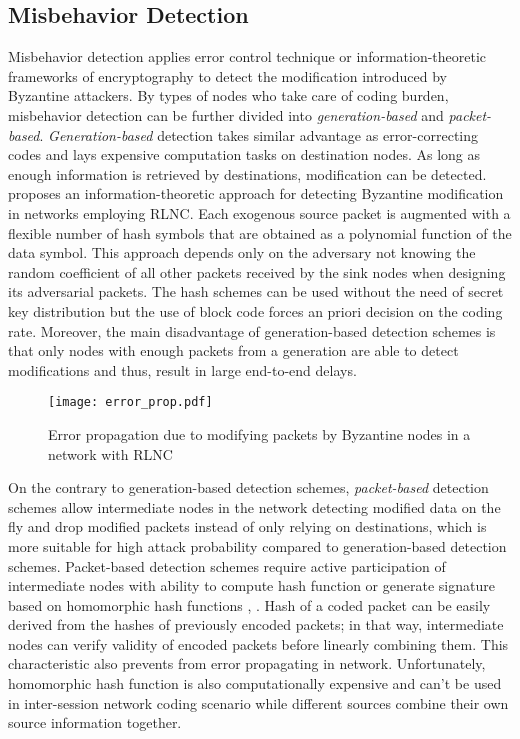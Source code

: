 \documentclass[conference]{IEEEtran}
\begin{document}
\subsection{Misbehavior Detection}
Misbehavior detection applies error control technique or information-theoretic frameworks of encryptography to detect the modification introduced by Byzantine attackers. By types of nodes who take care of coding burden, misbehavior detection can be further divided into \emph{generation-based} and \emph{packet-based}. \emph{Generation-based} detection takes similar advantage as error-correcting codes and lays expensive computation tasks on destination nodes. As long as enough information is retrieved by destinations, modification can be detected. \cite{byzantinemodification} proposes an information-theoretic approach for detecting Byzantine modification in networks employing RLNC. Each exogenous source packet is augmented with a flexible number of hash symbols that are obtained as a polynomial function of the data symbol. This approach depends only on the adversary not knowing the random coefficient of all other packets received by the sink nodes when designing its adversarial packets. The hash schemes can be used without the need of secret key distribution but the use of block code forces an priori decision on the coding rate. Moreover, the main disadvantage of generation-based detection schemes is that only nodes with enough packets from a generation are able to detect modifications and thus, result in large end-to-end delays.

\begin{figure}[!t]
\centering
\texttt{[image: error\_prop.pdf]}
\caption{Error propagation due to modifying packets by Byzantine nodes in a network with RLNC}
\label{fig_error_prop}
\end{figure}
On the contrary to generation-based detection schemes, \emph{packet-based} detection schemes allow intermediate nodes in the network detecting modified data on the fly and drop modified packets instead of only relying on destinations, which is more suitable for high attack probability compared to generation-based detection schemes. Packet-based detection schemes require active participation of intermediate nodes with ability to compute hash function or generate signature based on homomorphic hash functions \cite{signatureNC}, \cite{on-the-fly}. Hash of a coded packet can be easily derived from the hashes of previously encoded packets; in that way, intermediate nodes can verify validity of encoded packets before linearly combining them. This characteristic also prevents from error propagating in network. Unfortunately, homomorphic hash function is also computationally expensive and can't be used in inter-session network coding scenario while different sources combine their own source information together.
\end{document}
